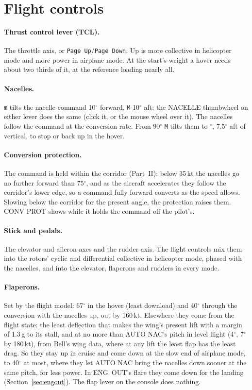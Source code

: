 \documentclass[11pt,a4paper,oneside]{book}
\newcommand{\key}[1]{\texttt{#1}}
\newcommand{\ann}[1]{\textsf{#1}}
\begin{document}
\section{Flight controls}
\paragraph{Thrust control lever (TCL).} The throttle axis, or \key{Page Up}/\key{Page Down}. Up is more collective in
helicopter mode and more power in airplane mode. At the start's weight a hover needs about two thirds of it, at the
reference loading nearly all.

\paragraph{Nacelles.} \key{m} tilts the nacelle command 10$^\circ$ forward, \key{M} 10$^\circ$ aft; the NACELLE
thumbwheel on either lever does the same (click it, or the mouse wheel over it). The nacelles follow the command at
the conversion rate. From 90$^\circ$ \key{M} tilts them to \MNacMax$^\circ$, 7.5$^\circ$ aft of vertical, to stop or
back up in the hover.

\paragraph{Conversion protection.} The command is held within the corridor (Part~II): below 35\,kt the nacelles go no
further forward than 75$^\circ$, and as the aircraft accelerates they follow the corridor's lower edge, so a command
fully forward converts as the speed allows. Slowing below the corridor for the present angle, the protection raises
them. \ann{CONV PROT} shows while it holds the command off the pilot's.

\paragraph{Stick and pedals.} The elevator and aileron axes and the rudder axis. The flight controls mix them into the
rotors' cyclic and differential collective in helicopter mode, phased with the nacelles, and into the elevator,
flaperons and rudders in every mode.

\paragraph{Flaperons.} Set by the flight model: 67$^\circ$ in the hover (least download) and 40$^\circ$ through the
conversion with the nacelles up, out by 160\,kt. Elsewhere they come from the flight state: the least deflection that
makes the wing's present lift with a margin of 1.3\,g to its stall, and at no more than AUTO NAC's pitch in level flight
(4$^\circ$, 7$^\circ$ by 180\,kt), from Bell's wing data, where at any lift the least flap has the least drag. So they stay
up in cruise and come down at the slow end of airplane mode, to 40$^\circ$ at most, where they let AUTO NAC bring the
nacelles down sooner at the same pitch, for less power. In ENG~OUT's flare they come down for the landing
(Section~\ref{sec:engout}). The flap lever on the console does nothing.
\end{document}

